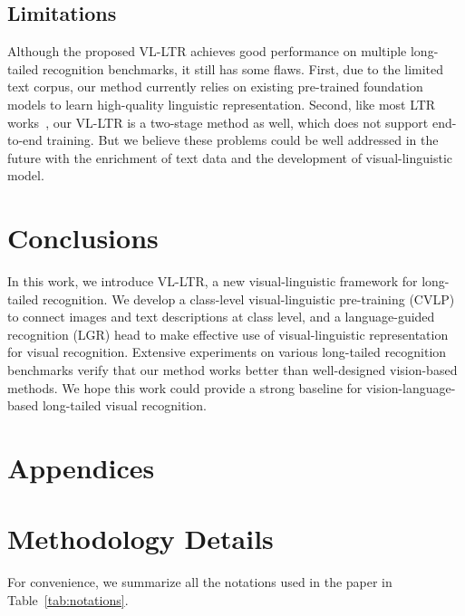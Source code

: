 \documentclass[runningheads]{llncs}
\begin{document}
\subsection{Limitations}
Although the proposed VL-LTR achieves good performance on multiple long-tailed recognition benchmarks, it still has some flaws.
First, due to the limited text corpus, our method currently relies on existing pre-trained foundation models to learn high-quality linguistic representation.
Second, like most LTR works~\cite{li2021self,cui2021parametric,kang2019decoupling}, our VL-LTR is a two-stage method as well, which does not support end-to-end training.
But we believe these problems could be well addressed in the future with the enrichment of text data and the development of visual-linguistic model.

\section{Conclusions}

In this work, we introduce VL-LTR, a new visual-linguistic framework for long-tailed recognition. 
We develop a class-level visual-linguistic pre-training (CVLP) to connect images and text descriptions at class level, and a language-guided recognition (LGR) head to make effective use of visual-linguistic representation for visual recognition.
Extensive experiments on various long-tailed recognition benchmarks verify that our method works better than well-designed vision-based methods.
We hope this work could provide a strong baseline for vision-language-based long-tailed visual recognition.





\section{Appendices}



\appendix
\section{Methodology Details}
\label{app:met}
For convenience, we summarize all the notations used in the paper in Table~\ref{tab:notations}.
\end{document}
